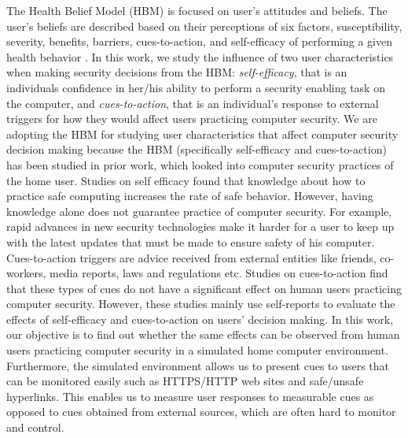 The Health Belief Model (HBM) is focused on user's attitudes and beliefs. 
The user's beliefs are described based on their perceptions of six factors, susceptibility, severity, benefits, barriers, cues-to-action, and self-efficacy of performing a given health behavior \cite{rosenstock88}. 
In this work, we study the influence of two user characteristics when making security decisions from the HBM: \textit{self-efficacy}, that is an individuals confidence in her/his ability to perform a security enabling task on the computer, and \textit{cues-to-action}, that is an individual's response to external triggers for how they would affect users practicing computer security. 
We are adopting the HBM for studying user characteristics that affect computer security decision making because the HBM (specifically self-efficacy and cues-to-action) has been studied in prior work, which looked into computer security practices of the home user. 
Studies on self efficacy found that \cite{urbanska2013,aytes2004,milne2009} knowledge about how to practice safe computing increases the rate of safe behavior. 
However, having knowledge alone does not guarantee practice of computer security. 
For example, rapid advances in new security technologies make it harder for a user to keep up with the latest updates that must be made to ensure safety of his computer. 
Cues-to-action triggers are advice received from external entities like friends, co-workers, media reports, laws and regulations etc. 
Studies on cues-to-action \cite{claar2010,ng2007} find that these types of cues do not have a significant effect on human users practicing computer security.  
However, these studies mainly use self-reports to evaluate the effects of self-efficacy and cues-to-action on users' decision making. 
In this work, our objective is to find out whether the same effects can be observed from human users practicing computer security in a simulated home computer environment. Furthermore, the simulated environment allows us to present cues to users that can be monitored easily such as HTTPS/HTTP web sites and safe/unsafe hyperlinks. 
This enables us to measure user responses to measurable cues as opposed to cues obtained from external sources, which are often hard to monitor and control.

